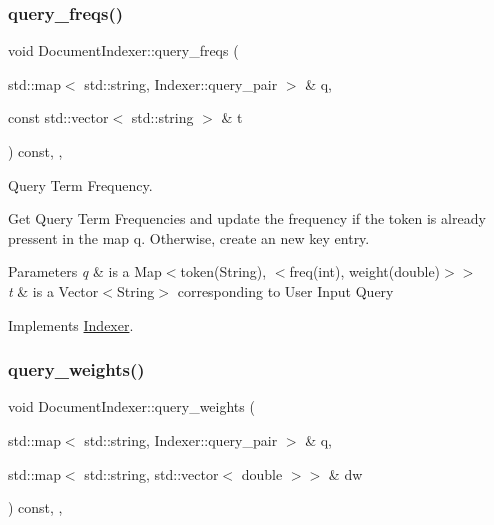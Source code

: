 \subsubsection{\texorpdfstring{query\+\_\+freqs()}{query\_freqs()}}
{\footnotesize\ttfamily void Document\+Indexer\+::query\+\_\+freqs (\begin{DoxyParamCaption}\item[{std\+::map$<$ std\+::string, Indexer\+::query\+\_\+pair $>$ \&}]{q,  }\item[{const std\+::vector$<$ std\+::string $>$ \&}]{t }\end{DoxyParamCaption}) const\hspace{0.3cm}{\ttfamily [override]}, {\ttfamily [private]}, {\ttfamily [virtual]}}



Query Term Frequency. 

Get Query Term Frequencies and update the frequency if the token is already pressent in the map q. Otherwise, create an new key entry.


\begin{DoxyParams}{Parameters}
{\em q} & is a Map$<$token(\+String), $<$freq(int), weight(double)$>$$>$ \\
\hline
{\em t} & is a Vector$<$\+String$>$ corresponding to User Input Query \\
\hline
\end{DoxyParams}


Implements \hyperlink{class_indexer_a0587f6a4d61620219473bf583ecdbad5}{Indexer}.

\mbox{\label{class_document_indexer_ad9a1b17fec1c999e98b58e3433727f05}} 
\subsubsection{\texorpdfstring{query\+\_\+weights()}{query\_weights()}}
{\footnotesize\ttfamily void Document\+Indexer\+::query\+\_\+weights (\begin{DoxyParamCaption}\item[{std\+::map$<$ std\+::string, Indexer\+::query\+\_\+pair $>$ \&}]{q,  }\item[{std\+::map$<$ std\+::string, std\+::vector$<$ double $>$$>$ \&}]{dw }\end{DoxyParamCaption}) const\hspace{0.3cm}{\ttfamily [override]}, {\ttfamily [private]}, {\ttfamily [virtual]}}



